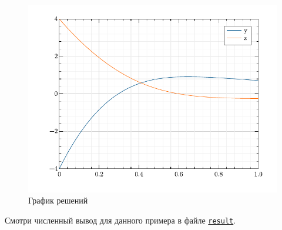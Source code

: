 \begin{figure}[H]
\captionsetup{justification=centering}
\setlength{\abovecaptionskip}{-10pt}
\renewcommand{\figurename}{Рисунок}
\caption{График решений}
\hspace{30pt}\includegraphics{../figures/result.pdf}
\end{figure}

Смотри численный вывод для данного примера в файле
\href{https://raw.githubusercontent.com/paveloom-p/P12/master/A2/result}{\footnotesize \texttt{result}}.


